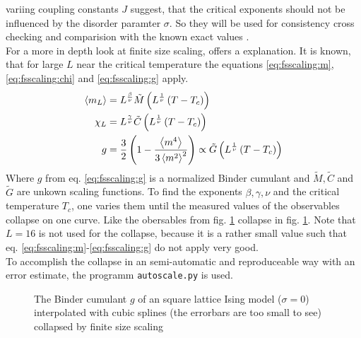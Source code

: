     variing coupling constants \(J\) suggest, that the
    critical exponents should not be influenced by the disorder paramter
    \(\sigma\). So they will be used for consistency cross checking and
    comparision with the known exact values \cite[S. 59]{Pelissetto2002}.\\
    For a more in depth look at finite size scaling, \cite{Norrenbrock2011}
    offers a explanation.
    It is known, that for large \(L\) near the critical temperature the
    equations \eqref{eq:fsscaling:m}, \eqref{eq:fsscaling:chi} and
    \eqref{eq:fsscaling:g} apply.
    \begin{align}
        \label{eq:fsscaling:m}
        \left< m_L \right> &= L^\frac{\beta}{\nu} \tilde{M}\left(L^\frac{1}{\nu}\left(T-T_c\right)\right)\\
        \label{eq:fsscaling:chi}
        \chi_L    &= L^\frac{\gamma}{\nu} \tilde{C}\left(L^\frac{1}{\nu}\left(T-T_c\right)\right)\\
        \label{eq:fsscaling:g}
        g          &= \frac{3}{2}\left(1-\frac{\left< m^4 \right>}{3\left< m^2 \right>^2}\right) \propto \tilde{G}\left(L^\frac{1}{\nu}\left(T-T_c\right)\right)
    \end{align}
    Where \(g\) from eq. \eqref{eq:fsscaling:g} is a normalized
    Binder cumulant \cite{Binder1981} and \(\tilde{M}, \tilde{C}\) and \(\tilde{G}\)
    are unkown scaling functions. To find the exponents
    \(\beta, \gamma, \nu\) and the critical temperature \(T_c\), one
    varies them until the measured values of the observables collapse on
    one curve. Like the obersables from fig. \ref{fig:gettingCrit}
    collapse in fig. \ref{fig:gettingCrit}.
    Note that \(L=16\) is not used for the collapse, because it is a
    rather small value such that eq. \eqref{eq:fsscaling:m}-\eqref{eq:fsscaling:g}
    do not apply very good.\\
    To accomplish the collapse in an semi-automatic and reproduceable
    way with an error estimate, the programm
    \texttt{autoscale.py} \cite{autoscale2009} is used.
    \begin{figure}[htbp]
        \centering
        \caption[Examples of determining critical temperature and exponents]
        {
            The Binder cumulant \(g\) of an square lattice Ising model
            (\(\sigma=0\))\\
             interpolated
                with cubic splines (the errorbars are too small to see)\\
             collapsed by finite
                size scaling
        }
        \label{fig:gettingCrit}
    \end{figure}\\
